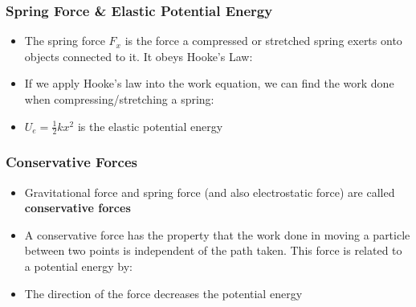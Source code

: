 \documentclass[12pt,compress,aspectratio=169]{beamer}
\begin{document}
\begin{frame}
  \frametitle{Spring Force \& Elastic Potential Energy}
  \begin{itemize}
  \item The spring force $F_x$ is the force a compressed or stretched spring
    exerts onto objects connected to it. It obeys Hooke's Law:
    
    \vspace{-.2in}{\Large
      \begin{displaymath}
        F_x=-kx
      \end{displaymath}
    }
  \item If we apply Hooke's law into the work equation, we can find the
    work done when compressing/stretching a spring:

  \item $U_e=\frac{1}{2}kx^2$ is the elastic potential energy
  \end{itemize}
\end{frame}

\begin{frame}
  \frametitle{Conservative Forces}
  \begin{itemize}
  \item Gravitational force and spring force (and also electrostatic force)
    are called \textbf{conservative forces}
  \item A conservative force has the property that the work done in moving a
    particle
    between two points is independent of the path taken. This force is related
    to a potential energy by:
    
  \item The direction of the force decreases the potential energy
  \end{itemize}
\end{frame}
\end{document}
